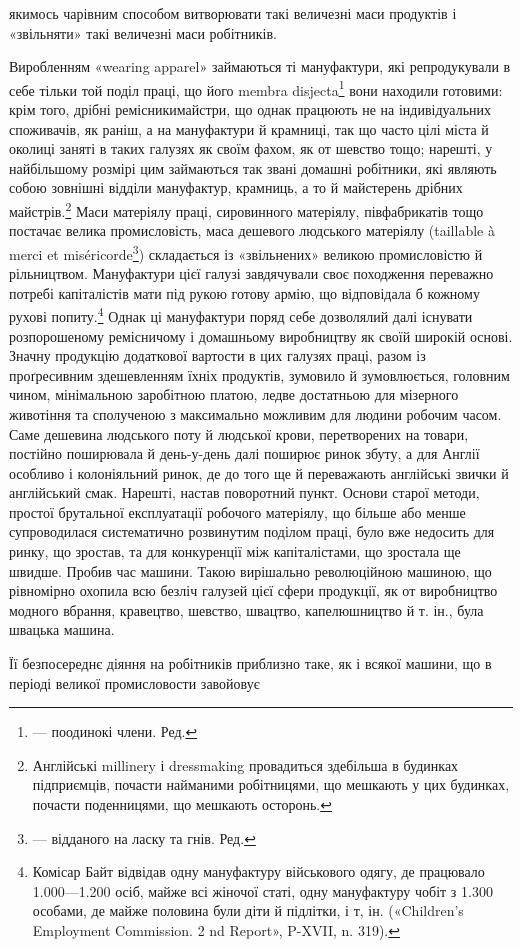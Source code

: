 \parcont{}  %
якимось чарівним способом витворювати такі величезні маси продуктів
і «звільняти» такі величезні маси робітників.

Виробленням «wearing apparel» займаються ті мануфактури,
які репродукували в себе тільки той поділ праці, що його membra
disjecta\footnote*{
— поодинокі члени. Ред.
} вони находили готовими: крім того, дрібні ремісникимайстри,
що однак працюють не на індивідуальних споживачів,
як раніш, а на мануфактури й крамниці, так що часто цілі міста
й околиці заняті в таких галузях як своїм фахом, як от шевство
тощо; нарешті, у найбільшому розмірі цим займаються так звані
домашні робітники, які являють собою зовнішні відділи мануфактур,
крамниць, а то й майстерень дрібних майстрів.\footnote{
Англійські millinery і dressmaking провадиться здебільша в
будинках підприємців, почасти найманими робітницями, що мешкають
у цих будинках, почасти поденницями, що мешкають осторонь.
} Маси
матеріялу праці, сировинного матеріялу, півфабрикатів тощо
постачає велика промисловість, маса дешевого людського матеріялу
(taillable à merci et miséricorde\footnote*{
— відданого на ласку та гнів. Ред.
}) складається із «звільнених»
великою промисловістю й рільництвом. Мануфактури
цієї галузі завдячували своє походження переважно потребі капіталістів
мати під рукою готову армію, що відповідала б кожному
рухові попиту.\footnote{
Комісар Байт відвідав одну мануфактуру військового одягу,
де працювало 1.000—1.200 осіб, майже всі жіночої статі, одну мануфактуру
чобіт з 1.300 особами, де майже половина були діти й підлітки, і
т, ін. («Children’s Employment Commission. 2 nd Report», P-XVII,
n. 319).
} Однак ці мануфактури поряд себе дозволялий далі
існувати розпорошеному ремісничому і домашньому виробництву
як своїй широкій основі. Значну продукцію додаткової вартости
в цих галузях праці, разом із проґресивним здешевленням їхніх
продуктів, зумовило й зумовлюється, головним чином, мінімальною
заробітною платою, ледве достатньою для мізерного животіння
та сполученою з максимально можливим для людини робочим
часом. Саме дешевина людського поту й людської крови, перетворених
на товари, постійно поширювала й день-у-день далі поширює
ринок збуту, а для Англії особливо і колоніяльний ринок, де
до того ще й переважають англійські звички й англійський смак.
Нарешті, настав поворотний пункт. Основи старої методи, простої
брутальної експлуатації робочого матеріялу, що більше або
менше супроводилася систематично розвинутим поділом праці,
було вже недосить для ринку, що зростав, та для конкуренції
між капіталістами, що зростала ще швидше. Пробив час машини.
Такою вирішально революційною машиною, що рівномірно охопила
всю безліч галузей цієї сфери продукції, як от виробництво
модного вбрання, кравецтво, шевство, швацтво, капелюшництво
й т. ін., була швацька машина.

Її безпосереднє діяння на робітників приблизно таке, як і
всякої машини, що в періоді великої промисловости завойовує
\parbreak{}  %
